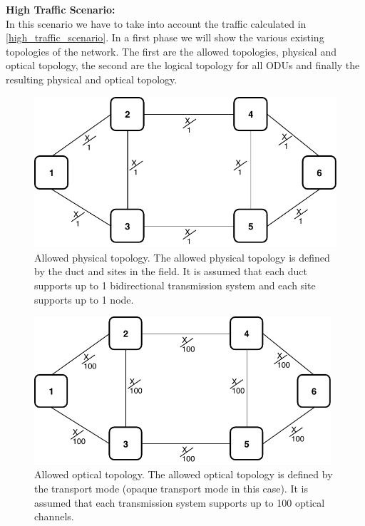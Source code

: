\vspace{15pt}
\textbf{High Traffic Scenario:}\\

In this scenario we have to take into account the traffic calculated in \ref{high_traffic_scenario}. In a first phase we will show the various existing topologies of the network. The first are the allowed topologies, physical and optical topology, the second are the logical topology for all ODUs and finally the resulting physical and optical topology.\\

\begin{figure}[h!]
\centering
\includegraphics[width=12cm]{sdf/ilp/opaque_protection/figures/allowed_physical_topology}
\caption{Allowed physical topology. The allowed physical topology is defined by the duct and sites in the field. It is assumed that each duct supports up to 1 bidirectional transmission system and each site supports up to 1 node.}
\label{allowed_physical_protectionhigh}
\end{figure}
\newpage
\begin{figure}[h!]
\centering
\includegraphics[width=11cm]{sdf/ilp/opaque_protection/figures/allowed_optical_topology}
\caption{Allowed optical topology. The allowed optical topology is defined by the transport mode (opaque transport mode in this case). It is assumed that each transmission system supports up to 100 optical channels.}
\label{allowed_optical_protectionhigh}
\end{figure}

